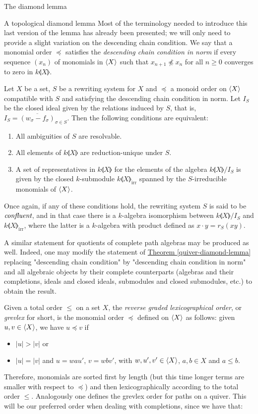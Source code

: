 \begin{chapter}{The diamond lemma}
\begin{section}{A topological diamond lemma}
Most of the terminology needed to introduce this last version of the lemma has already been presented; we will only need to provide a slight variation on the descending chain condition. We say that a monomial order $\preceq$ satisfies the \emph{descending chain condition in norm} if every sequence $(x_n)$ of monomials in $\langle X\rangle$ such that $x_{n+1}\not\preceq x_n$ for all $n\geq 0$ converges to zero in $k\llangle X\rrangle$.

\begin{thm} Let $X$ be a set, $S$ be a rewriting system for $X$ and $\preceq$ a monoid order on $\langle X\rangle$ compatible with $S$ and satisfying the descending chain condition in norm. Let $I_S$ be the closed ideal given by the relations induced by $S$, that is, $I_S=\overline{(w_\sigma-f_\sigma)}_{\sigma\in S}$. Then the following conditions are equivalent:
\begin{enumerate}
\item All ambiguities of $S$ are resolvable.
\item All elements of $k\llangle X\rrangle$ are reduction-unique under $S$.
\item A set of representatives in $k\llangle X\rrangle$ for the elements of the algebra $k\llangle X\rrangle/I_S$ is given by the closed $k$-submodule $k\llangle X\rrangle_{\mathrm{irr}}$ spanned by the $S$-irreducible monomials of $\langle X\rangle$.
\end{enumerate}
Once again, if any of these conditions hold, the rewriting system $S$ is said to be $\emph{confluent}$, and in that case  there is a $k$-algebra isomorphism between $k\llangle X\rrangle/I_S$ and $k\llangle X\rrangle_{\mathrm{irr}}$, where the latter is a $k$-algebra with product defined as $x\cdot y= r_S(xy)$.
\end{thm}

A similar statement for quotients of complete path algebras may be produced as well. Indeed, one may modify the statement of \hyperref[quiver-diamond-lemma]{Theorem \ref*{quiver-diamond-lemma}} replacing "descending chain condition" by "descending chain condition in norm" and all algebraic objects by their complete counterparts (algebras and their completions, ideals and closed ideals, submodules and closed submodules, etc.) to obtain the result.

Given a total order $\leq$ on a set $X$, the \emph{reverse graded lexicographical order}, or \emph{grevlex} for short, is the monomial order $\preceq$ defined on $\langle X\rangle$ as follows: given $u,v\in \langle X\rangle$, we have $u\preceq v$ if
\begin{itemize}
\item $|u| > |v|$ or
\item $|u| = |v|$ and $u=wau'$, $v=wbv'$, with $w,u',v'\in \langle X\rangle$, $a,b\in X$ and $a\leq b$.
\end{itemize}
Therefore, monomials are sorted first by length (but this time longer terms are smaller with respect to $\preceq$) and then lexicographically according to the total order $\leq$. Analogously one defines the grevlex order for paths on a quiver. This will be our preferred order when dealing with completions, since we have that:


\end{section}
\end{chapter}
